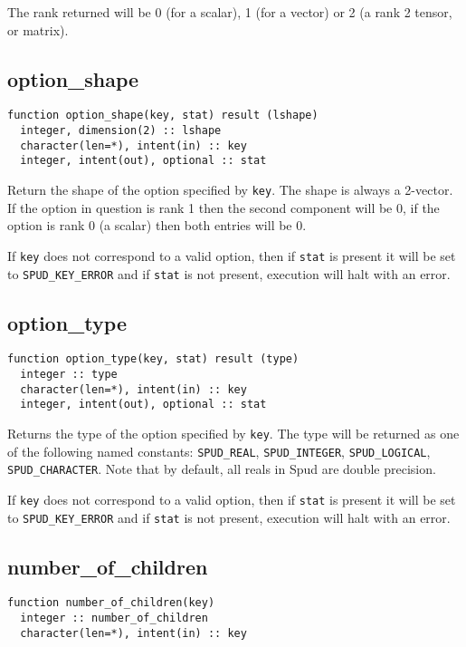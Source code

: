 \documentclass[a4paper, 11pt]{book}
\begin{document}
The rank returned will be 0 (for a scalar), 1 (for a vector) or 2 (a rank 2
tensor, or matrix). 

\subsection{option\_shape}

\begin{lstlisting}
function option_shape(key, stat) result (lshape)
  integer, dimension(2) :: lshape
  character(len=*), intent(in) :: key
  integer, intent(out), optional :: stat
\end{lstlisting}

Return the shape of the option specified by \lstinline+key+. The shape is
always a 2-vector. If the option in question is rank 1 then the second
component will be 0, if the option is rank 0 (a scalar) then both entries
will be 0.

 If \lstinline+key+ does not correspond to a valid option, then if
 \lstinline+stat+ is present it will be set to \lstinline+SPUD_KEY_ERROR+ and
 if \lstinline+stat+ is not present, execution will halt with an error.

\subsection{option\_type}

\begin{lstlisting}
function option_type(key, stat) result (type)
  integer :: type
  character(len=*), intent(in) :: key
  integer, intent(out), optional :: stat
\end{lstlisting}

Returns the type of the option specified by \lstinline+key+. The type will
be returned as one of the following named constants: 
\lstinline+SPUD_REAL+, \lstinline+SPUD_INTEGER+, \lstinline+SPUD_LOGICAL+,
\lstinline+SPUD_CHARACTER+. Note that by default, all reals in Spud are
double precision.

If \lstinline+key+ does not correspond to a valid option, then if
\lstinline+stat+ is present it will be set to \lstinline+SPUD_KEY_ERROR+ and
if \lstinline+stat+ is not present, execution will halt with an error.

\subsection{number\_of\_children}

\begin{lstlisting}
function number_of_children(key)
  integer :: number_of_children
  character(len=*), intent(in) :: key
\end{lstlisting}
\end{document}
